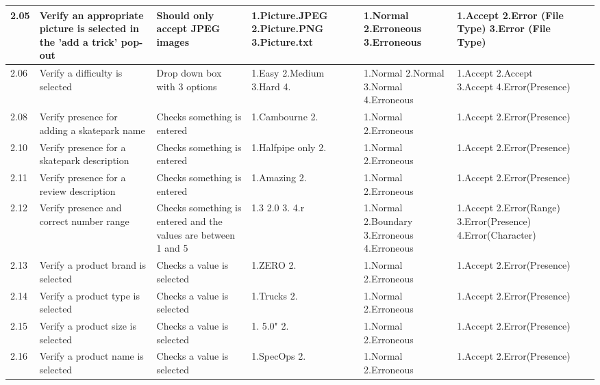 \begin{landscape}
\begin{center}
\begin{longtable}{|p{1.5cm}|p{2.5cm}|p{2.5cm}|p{2cm}|p{2cm}|p{2cm}|p{2cm}|p{2cm}|}
2.05 & Verify an appropriate picture is selected in the 'add a trick' pop-out & Should only accept JPEG images & 1.Picture.JPEG 2.Picture.PNG 3.Picture.txt & 1.Normal 2.Erroneous 3.Erroneous & 1.Accept 2.Error (File Type) 3.Error (File Type) & & \\ \hline

2.06 & Verify a difficulty is selected & Drop down box with 3 options & 1.Easy 2.Medium 3.Hard 4. & 1.Normal 2.Normal 3.Normal 4.Erroneous & 1.Accept 2.Accept 3.Accept 4.Error(Presence) & & \\ \hline


2.08 & Verify presence for adding a skatepark name & Checks something is entered & 1.Cambourne 2.  & 1.Normal 2.Erroneous & 1.Accept 2.Error(Presence) & & \\ \hline 



2.10 & Verify presence for a skatepark description & Checks something is entered & 1.Halfpipe only 2.  & 1.Normal 2.Erroneous & 1.Accept 2.Error(Presence) & & \\ \hline

2.11 & Verify presence for a review description & Checks something is entered & 1.Amazing 2. & 1.Normal 2.Erroneous & 1.Accept 2.Error(Presence) & & \\ \hline

2.12 & Verify presence and correct number range & Checks something is entered and the values are between 1 and 5 & 1.3 2.0 3. 4.r & 1.Normal 2.Boundary 3.Erroneous 4.Erroneous & 1.Accept 2.Error(Range) 3.Error(Presence) 4.Error(Character) & & \\ \hline

2.13 & Verify a product brand is selected & Checks a value is selected & 1.ZERO 2. & 1.Normal 2.Erroneous & 1.Accept 2.Error(Presence) & & \\ \hline

2.14 & Verify a product type is selected & Checks a value is selected & 1.Trucks 2. & 1.Normal 2.Erroneous & 1.Accept 2.Error(Presence) & & \\ \hline

2.15 & Verify a product size is selected & Checks a value is selected & 1. 5.0" 2. & 1.Normal 2.Erroneous & 1.Accept 2.Error(Presence) & & \\ \hline

2.16 & Verify a product name is selected & Checks a value is selected & 1.SpecOps 2. & 1.Normal 2.Erroneous & 1.Accept 2.Error(Presence) & & \\ \hline






\end{longtable}
\end{center}
\end{landscape}
